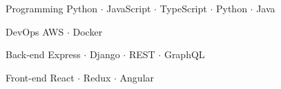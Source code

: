 

\begin{cvskills}

\cvskill
  {Programming} %
  {Python $\cdot$ JavaScript $\cdot$ TypeScript $\cdot$ Python $\cdot$ Java} %

  \cvskill
    {DevOps} %
    {AWS $\cdot$ Docker} %

  \cvskill
    {Back-end} %
    {Express $\cdot$ Django $\cdot$ REST $\cdot$ GraphQL} %

  \cvskill
    {Front-end} %
    {React $\cdot$ Redux $\cdot$ Angular} %


\end{cvskills}
